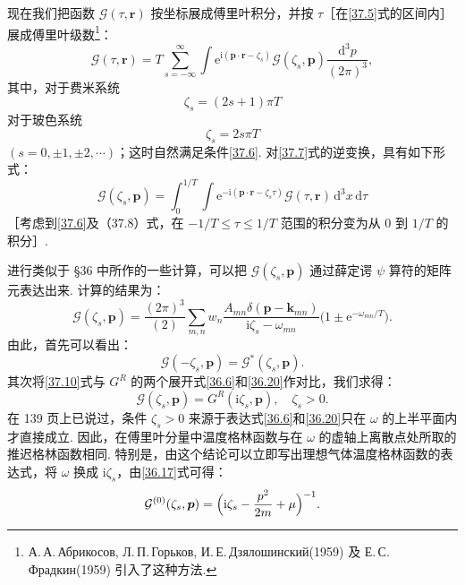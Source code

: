 现在我们把函数 $\mathcal G(\tau,\bm r)$ 按坐标展成傅里叶积分，并按 $\tau$［在\eqref{37.5}式的区间内］展成傅里叶级数\footnote{А.\,А.\,Абрикосов, Л.\,П.\,Горьков, И.\,Е.\,Дзялошинский(1959) 及 Е.\,С.\,Фрадкин(1959) 引入了这种方法.}：
\begin{equation}
\mathcal G(\tau,\bm r)=T\sum_{s=-\infty}^{\infty}\int\mathrm{e}^{\mathrm{i}(\bm p\cdot\bm r-\zeta_s)}
\mathcal G(\zeta_s,\bm p)\frac{\mathrm{d}^{3}p}{(2\pi)^{3}},
\label{37.7}
\end{equation}
其中，对于费米系统
\begin{equation*}
\zeta_s=(2s+1)\pi T\tag{37.8a}\label{37.8a}
\end{equation*}
对于玻色系统
\begin{equation*}
\zeta_s=2s\pi T\tag{37.8b}\label{37.8b}
\end{equation*}
\setcounter{equation}{8}%
$(s=0,\pm1,\pm2,\cdots)$；这时自然满足条件\eqref{37.6}. 对\eqref{37.7}式的逆变换，具有如下形式：
\begin{equation}
\mathcal G(\zeta_s,\bm p)=\int_{0}^{1/T}\int\mathrm{e}^{-\mathrm{i}(\bm p\cdot\bm r-\zeta_s\tau)}
\mathcal G(\tau,\bm r)\,\mathrm{d}^{3}x\,\mathrm{d}\tau
\label{37.9}
\end{equation}
［考虑到\eqref{37.6}及（37.8）式，在 $-1/T\leqslant\tau\leqslant 1/T$ 范围的积分变为从 0 到 $1/T$ 的积分］.

进行类似于 §36 中所作的一些计算，可以把 $\mathcal G(\zeta_s,\bm p)$ 通过薛定谔 $\psi$ 算符的矩阵元表达出来. 计算的结果为：
\begin{equation}
\mathcal G(\zeta_s,\bm p)=\frac{(2\pi)^{3}}{(2)}\sum_{m,n}w_n
\frac{A_{mn}\delta(\bm p-\bm k_{mn})}{\mathrm{i}\zeta_s-\omega_{mn}}
\bigl(1\pm\mathrm{e}^{-\omega_{mn}/T}\bigr).
\label{37.10}
\end{equation}
由此，首先可以看出：
\begin{equation}
\mathcal G(-\zeta_s,\bm p)=\mathcal G^{*}(\zeta_s,\bm p).
\label{37.11}
\end{equation}
其次将\eqref{37.10}式与 $G^{R}$ 的两个展开式\eqref{36.6}和\eqref{36.20}作对比，我们求得：
\begin{equation}
\mathcal G(\zeta_s,\bm p)=G^{R}(\mathrm{i}\zeta_s,\bm p),\quad\zeta_s>0.
\label{37.12}
\end{equation}
在 139 页上已说过，条件 $\zeta_s>0$ 来源于表达式\eqref{36.6}和\eqref{36.20}只在 $\omega$ 的上半平面内才直接成立. 因此，在傅里叶分量中温度格林函数与在 $\omega$ 的虚轴上离散点处所取的推迟格林函数相同. 特别是，由这个结论可以立即写出理想气体温度格林函数的表达式，将 $\omega$ 换成 $\mathrm{i}\zeta_s$，由\eqref{36.17}式可得：
\begin{equation}
\mathcal G^{(0)}(\zeta_s,\bm p)=\Bigl(\mathrm{i}\zeta_s-\frac{p^{2}}{2m}+\mu\Bigr)^{-1}.
\label{37.13}
\end{equation}

